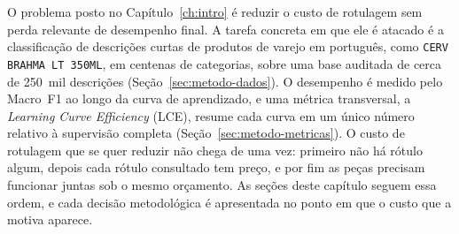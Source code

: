 
O problema posto no Capítulo~\ref{ch:intro} é reduzir o custo de rotulagem
sem perda relevante de desempenho final. A tarefa concreta em que ele é
atacado é a classificação de descrições curtas de produtos de varejo em
português, como \texttt{CERV BRAHMA LT 350ML}, em centenas de categorias,
sobre uma base auditada de cerca de 250~mil descrições
(Seção~\ref{sec:metodo-dados}). O desempenho é medido pelo Macro~F1 ao
longo da curva de aprendizado, e uma métrica transversal, a \textit{Learning
Curve Efficiency} (LCE), resume cada curva em um único número relativo à
supervisão completa (Seção~\ref{sec:metodo-metricas}). O custo de rotulagem
que se quer reduzir não chega de uma vez: primeiro não há rótulo algum,
depois cada rótulo consultado tem preço, e por fim as peças precisam
funcionar juntas sob o mesmo orçamento. As seções deste capítulo seguem
essa ordem, e cada decisão metodológica é apresentada no ponto em que o
custo que a motiva aparece.

